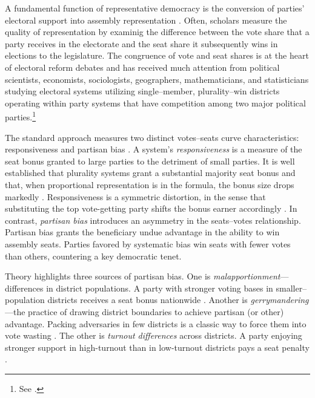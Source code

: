 \documentclass[letter,12pt]{article}
\begin{document}
\noindent A fundamental function of representative democracy is the conversion of parties' electoral support into assembly representation \citep{lijphartElSysPtySys.1994}. Often, scholars measure the quality of representation by examinig the difference between the vote share that a party receives in the electorate and the seat share it subsequently wins in elections to the legislature. The congruence of vote and seat shares is at the heart of electoral reform debates and has received much attention from political scientists, economists, sociologists, geographers, mathematicians, and statisticians studying electoral systems utilizing single--member, plurality--win districts operating within party systems that have competition among two major political parties.\footnote{See \citet{altman.mcdonald2011bard,balinskiYoung2001FairRep,brady.grofmanBiasResponsiveness1991,cain.partisanRedistricting.1985,cox.katz.2002,engstrom2006redisttrictApsr,erikson1972malapportionment,gelman.king.1994EvalElSysRedis,grofmanBiasProportionality.1983,grofman.etalBiasMalapp.1997,gudgin.taylor.1980decomposeBias,johnston.2002,kendall.stuartCubeLaw1950,king.browning1987biasRespUS,niemi.fett1986swing,rae.1967,rossiter.etal.1997,taagepera.CubeLaw.1973,trelles.mtz.polygob2012,tufte1973seatsVotes}.\label{fn:cites}}

The standard approach measures two distinct votes--seats curve characteristics: responsiveness and partisan bias \citep{tufte1973seatsVotes,king.browning1987biasRespUS}. A system's \emph{responsiveness} is a measure of the seat bonus granted to large parties to the detriment of small parties. It is well established that plurality systems grant a substantial majority seat bonus and that, when proportional representation is in the formula, the bonus size drops markedly \citep{taagepera.shugart.1989,linzerSeatVoteElasticity2012}. Responsiveness is a symmetric distortion, in the sense that substituting the top vote-getting party shifts the bonus earner accordingly \citep{grofman.king.2008.partisansymmetry}. In contrast, \emph{partisan bias} introduces an asymmetry in the seats--votes relationship. Partisan bias grants the beneficiary undue advantage in the ability to win assembly seats. Parties favored by systematic bias win seats with fewer votes than others, countering a key democratic tenet.

Theory highlights three sources of partisan bias. One is \emph{malapportionment}---differences in district populations. A party with stronger voting bases in smaller--population districts receives a seat bonus nationwide \citep{johnston.2002,jackmanMeasuringBias1994}. Another is \emph{gerrymandering}---the practice of drawing district boundaries to achieve partisan (or other) advantage. Packing adversaries in few districts is a classic way to force them into vote wasting \citep{owen.grofman.1988.partisangerrymandering,cox.katz.2002,engstrom2006redisttrictApsr}. The other is \emph{turnout differences} across districts. A party enjoying stronger support in high-turnout than in low-turnout districts pays a seat penalty \citep{campbellTurnoutBias1996,rosenstone.hansen.1993}.  
\end{document}
